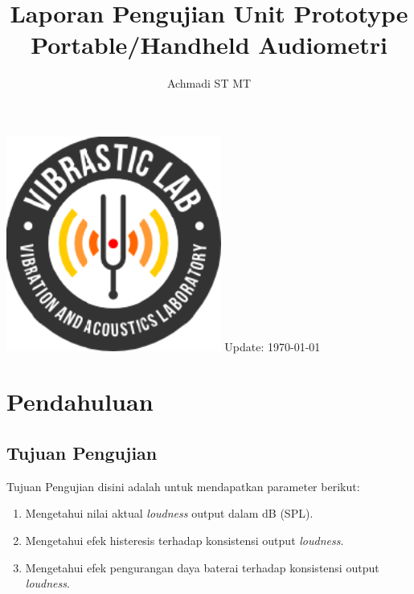 \documentclass[12pt,]{article}
\title{\LARGE \bf
	Laporan Pengujian Unit Prototype Portable/Handheld Audiometri\\
}
\author{Achmadi ST MT}
\date{}
\begin{document}
	\thispagestyle{empty}
	
	\begin{titlepage}
		\centering
		\vfill
		\vfill
		\maketitle
		\vfill
		\includegraphics[width=200pt]{images/logo/logoviblab}
		\vfill
		\vfill
		Update: {\today} \currenttime \\
	\end{titlepage}
	
	
	\newpage
	\tableofcontents
	
	
	\newpage
	\section{Pendahuluan}
	
	\subsection{Tujuan Pengujian}
	
	Tujuan Pengujian disini adalah untuk mendapatkan parameter berikut:
	\begin{enumerate}
		\item Mengetahui nilai aktual \textit{loudness} output dalam dB (SPL).
		\item Mengetahui efek histeresis terhadap konsistensi output \textit{loudness}.
		\item Mengetahui efek pengurangan daya baterai terhadap konsistensi output \textit{loudness}.
	\end{enumerate}
\end{document}
